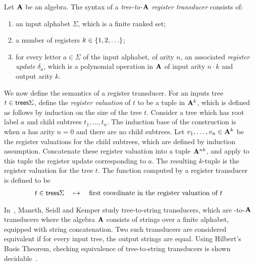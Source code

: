 \begin{definition} Let $\mathbf{A}$ be an algebra. The syntax of a  \emph{tree-to-$\mathbf{A}$ register transducer} consists of:
    \begin{enumerate}
        \item an input alphabet $\Sigma$, which is a finite ranked set;
        \item a number of registers $k \in \{1,2,\ldots\}$;
        \item for every letter $a \in \Sigma$ of the input alphabet, of arity $n$, an associated \emph{register update} $\delta_a$, which is a polynomial operation in $\mathbf{A}$ of input arity $n \cdot k$ and output arity $k$. 
    \end{enumerate}
\end{definition}



We now define the semantics of a  register transducer. For an inputs  tree $t \in {\mathsf{trees}} \Sigma$, define the \emph{register valuation} of $t$ to be a tuple in $\mathbf{A}^k$, which  is defined as follows by induction on the size of the tree $t$. Consider a tree which has root label $a$ and child subtrees $t_1,\ldots,t_n$. The induction base of the construction is when $a$ has arity $n=0$ and there are no child subtrees. Let $v_1,\ldots,v_n \in \mathbf{A}^k$ be the register valuations for the child subtrees, which are defined by induction assumption. Concatenate these register valuation into a tuple $\mathbf{A}^{nk}$, and apply to this tuple the register update corresponding to $a$. The resulting $k$-tuple is the register valuation for the tree $t$. The function computed by a register transducer is defined to be 
\begin{align*}
t \in {\mathsf{trees}} \Sigma \quad \mapsto \quad \text{first coordinate in the register valuation of $t$}
\end{align*}

\begin{example} In~\cite{seidlManethKemper2018}, Maneth, Seidl and Kemper study tree-to-string transducers, which are -to-$\mathbf{A}$ transducers where  the algebra $\mathbf{A}$ consists of strings over a finite alphabet, equipped with string concatenation. Two such transducers are considered equivalent if for every input tree, the output strings are equal. Using Hilbert's Basis Theorem, checking equivalence of tree-to-string transducers is shown decidable~\cite[Corollary 8.2]{seidlManethKemper2018}.
\end{example}

